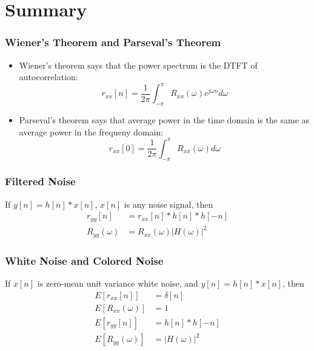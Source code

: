 \documentclass{beamer}
\begin{document}
\section[Summary]{Summary}
\setcounter{subsection}{1}

\begin{frame}
  \frametitle{Wiener's Theorem and Parseval's Theorem}
  \begin{itemize}
  \item Wiener's theorem says that the power spectrum is the DTFT of
    autocorrelation:
    \begin{displaymath}
      r_{xx}[n] = \frac{1}{2\pi}\int_{-\pi}^\pi R_{xx}(\omega)e^{j\omega n}d\omega
    \end{displaymath}
  \item Parseval's theorem says that average power in the time domain
    is the same as average power in the frequeny domain:
    \begin{displaymath}
      r_{xx}[0] = \frac{1}{2\pi}\int_{-\pi}^\pi R_{xx}(\omega)d\omega
    \end{displaymath}
  \end{itemize}
\end{frame}

\begin{frame}
  \frametitle{Filtered Noise}

  If $y[n]=h[n]\ast x[n]$, $x[n]$ is any noise signal, then
  \begin{align*}
    r_{yy}[n] &= r_{xx}[n]\ast h[n]\ast h[-n]\\
    R_{yy}(\omega) &= R_{xx}(\omega) |H(\omega)|^2
  \end{align*}
\end{frame}
  
\begin{frame}
  \frametitle{White Noise and Colored Noise}
  
  If $x[n]$ is zero-mean unit variance white noise, and $y[n]=h[n]\ast
  x[n]$, then
  \begin{align*}
    E\left[r_{xx}[n]\right] &= \delta[n]\\
    E\left[R_{xx}(\omega)\right] &= 1\\
    E\left[r_{yy}[n]\right] &= h[n]\ast h[-n]\\
    E\left[R_{yy}(\omega)\right] &= |H(\omega)|^2
  \end{align*}
\end{frame}
\end{document}
